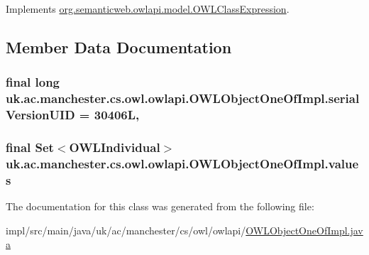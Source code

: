 Implements \hyperlink{interfaceorg_1_1semanticweb_1_1owlapi_1_1model_1_1_o_w_l_class_expression_aa209626b5e5a33649a50cb0c4ac7de1f}{org.\-semanticweb.\-owlapi.\-model.\-O\-W\-L\-Class\-Expression}.



\subsection{Member Data Documentation}
\hypertarget{classuk_1_1ac_1_1manchester_1_1cs_1_1owl_1_1owlapi_1_1_o_w_l_object_one_of_impl_a36a2f7bea84b89fc222da55bd000d14f}{
\subsubsection[{serial\-Version\-U\-I\-D}]{\setlength{\rightskip}{0pt plus 5cm}final long uk.\-ac.\-manchester.\-cs.\-owl.\-owlapi.\-O\-W\-L\-Object\-One\-Of\-Impl.\-serial\-Version\-U\-I\-D = 30406\-L\hspace{0.3cm}{\ttfamily [static]}, {\ttfamily [private]}}}\label{classuk_1_1ac_1_1manchester_1_1cs_1_1owl_1_1owlapi_1_1_o_w_l_object_one_of_impl_a36a2f7bea84b89fc222da55bd000d14f}
\hypertarget{classuk_1_1ac_1_1manchester_1_1cs_1_1owl_1_1owlapi_1_1_o_w_l_object_one_of_impl_a168bc7c45fa11bd10943672559a09bba}{
\subsubsection[{values}]{\setlength{\rightskip}{0pt plus 5cm}final Set$<${\bf O\-W\-L\-Individual}$>$ uk.\-ac.\-manchester.\-cs.\-owl.\-owlapi.\-O\-W\-L\-Object\-One\-Of\-Impl.\-values\hspace{0.3cm}{\ttfamily [private]}}}\label{classuk_1_1ac_1_1manchester_1_1cs_1_1owl_1_1owlapi_1_1_o_w_l_object_one_of_impl_a168bc7c45fa11bd10943672559a09bba}


The documentation for this class was generated from the following file\-:\begin{DoxyCompactItemize}
\item 
impl/src/main/java/uk/ac/manchester/cs/owl/owlapi/\hyperlink{_o_w_l_object_one_of_impl_8java}{O\-W\-L\-Object\-One\-Of\-Impl.\-java}\end{DoxyCompactItemize}
